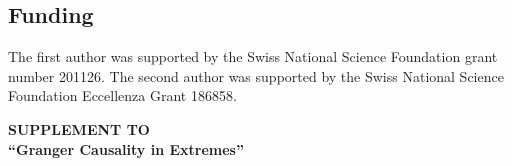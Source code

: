\documentclass[a4paper,11pt]{article}
\begin{document}
\subsection*{Funding}
The first author was supported by the Swiss National Science Foundation grant number 201126. 
The second author was supported by the Swiss National Science Foundation Eccellenza Grant 186858. 




\begin{footnotesize}

\end{footnotesize}


\newpage

\appendix

\begin{center}
{\LARGE\bf 
SUPPLEMENT TO\\ 
\vspace{12pt} 
``Granger Causality in Extremes''}
\end{center}

\vspace{10mm}


\setcounter{section}{0}
\setcounter{subsection}{0}
\setcounter{equation}{0}
\setcounter{figure}{0}
\setcounter{table}{0}

\setcounter{lemma}{0}
\setcounter{proposition}{0}
\setcounter{definition}{0}
\setcounter{example}{0}
\setcounter{algocf}{0}

\renewcommand{\thesection}{S.\arabic{section}}
\renewcommand{\thesubsection}{S.\arabic{section}.\arabic{subsection}}
\renewcommand{\theequation}{S.\arabic{equation}}
\renewcommand{\thefigure}{S.\arabic{figure}}
\renewcommand{\thetable}{S.\arabic{table}}
\renewcommand{\thealgocf}{S.\arabic{algocf}}

\renewcommand{\theHsection}{S.\thesection}
\renewcommand{\theHsubsection}{S.\thesubsection}
\renewcommand{\theHequation}{S.\theequation}
\renewcommand{\theHfigure}{S.\thefigure}
\renewcommand{\theHtable}{S.\thetable}
\renewcommand{\theHalgocf}{S.\thealgocf}

\renewcommand{\thelemma}{S.\arabic{lemma}}
\renewcommand{\theproposition}{S.\arabic{proposition}}
\renewcommand{\thedefinition}{S.\arabic{definition}}
\renewcommand{\theexample}{S.\arabic{example}}

\renewcommand{\theHlemma}{S.\thelemma}
\renewcommand{\theHproposition}{S.\theproposition}
\renewcommand{\theHdefinition}{S.\thedefinition}
\renewcommand{\theHexample}{S.\theexample}
\end{document}
